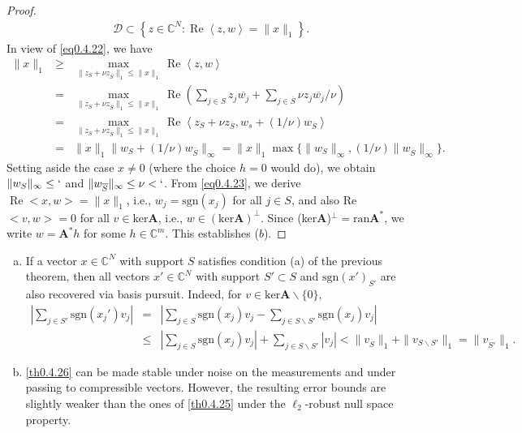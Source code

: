\begin{proof}
\begin{eqnarray}
        \label{eq0.4.23}
        \mathcal{D} \subset \left\{ z \in \mathbb{C}^N : \mathop{\mathrm{Re}}\left<z,w\right> = \|x\|_1 \right\}.
    \end{eqnarray}
    In view of \cref{eq0.4.22}, we have
    \begin{eqnarray*}
        \|x\|_1 &\geq& \max\limits_{\|z_S+\nu z_{\overline{S}}\|_1 \leq \|x\|_1}^{} \mathop{\mathrm{Re}}\left<z,w\right> \\
        &=& \max\limits_{\|z_S + \nu z_{\overline{S}}\|_1 \leq \|x\|_1}^{} \mathop{\mathrm{Re}} \left( \sum\limits_{j \in S}^{} z_j \overline{w_j} + \sum\limits_{j \in \overline{S}}^{} \nu z_j \overline{w_j}/\nu \right) \\
        &=& \max\limits_{\|z_S + \nu z_{\overline{S}}\|_1 \leq \|x\|_1}^{} \mathop{\mathrm{Re}} \left<z_S + \nu z_{\overline{S}}, w_s +(1/\nu)w_{\overline{S}}\right> \\
        &=&  \|x\|_1 \|w_S + (1/\nu)w_{\overline{S}}\|_{\infty} = \|x\|_1 \max \{\|w_S\|_{\infty}, (1/\nu)\|w_{\overline{S}}\|_{\infty}\}.
    \end{eqnarray*}
    Setting aside the case $x \neq 0$ (where the choice $h=0$ would do), we obtain $\|w_S\|_{\infty} \leq `$ and $\|w_{\overline{S}}\|_{\infty} \leq \nu <`$. From \cref{eq0.4.23}, we derive $\mathop{\mathrm{Re}}<x,w> = \|x\|_1$, i.e., $w_j = \text{sgn}(x_j)$ for all $j \in S$, and also Re$<v,w> = 0$ for all $v \in \text{ker}\mathbf{A}$, i.e., $w \in (\text{ker}\mathbf{A})^{\perp}$. Since (ker$\mathbf{A}$)$^{\perp} = \text{ran}\mathbf{A}^*$, we write $w = \mathbf{A}^*h$ for some $h \in \mathbb{C}^m$. This establishes ($b$).

\end{proof}

\begin{remark}
    \label{rmk0.4.27}
    \begin{enumerate}[(a)]
        \item If a vector $x \in \mathbb{C}^N$ with support $S$ satisfies condition (a) of the previous theorem, then all vectors $x' \in \mathbb{C}^N$ with support $S' \subset S$ and $\text{sgn}(x')_{S'}$ are also recovered via basis pursuit. Indeed, for $v \in \text{ker}\mathbf{A} \backslash \{0\}$,
            \begin{eqnarray*}
                \left|\sum\limits_{j\in S'}^{}\text{sgn}(x_j')v_j\right| &=& \left|\sum\limits_{j \in S}^{}\text{sgn}(x_j)v_j - \sum\limits_{j \in S\backslash S'}^{}\text{sgn}(x_j)v_j\right| \\
                &\leq& \left|\sum\limits_{j \in S}^{}\text{sgn}(x_j)v_j \right| + \sum\limits_{j \in S \backslash S'}^{}|v_j| < \|v_{\overline{S}}\|_1 + \|v_{S \backslash S'}\|_1 = \|v_{\overline{S'}}\|_1.
            \end{eqnarray*}
        \item \cref{th0.4.26} can be made stable under noise on the measurements and under passing to compressible vectors. However, the resulting error bounds are slightly weaker than the ones of \cref{th0.4.25} under the $\ell_2$-robust null space property.
    \end{enumerate}
\end{remark}

